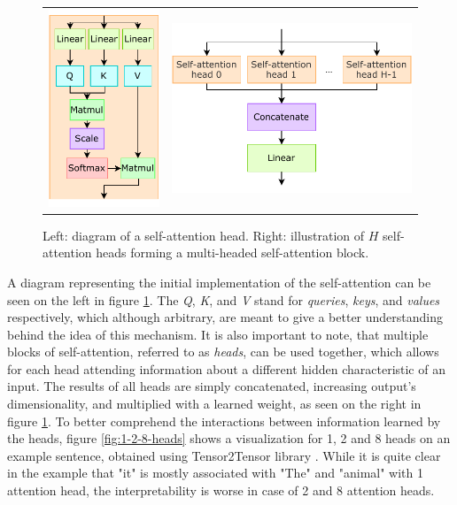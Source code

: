 \begin{figure}[!hpt]
  \centering
  \begin{tabular}{cc}
      {\includegraphics[width=0.2\columnwidth]{background/self_attention.pdf}} &
      {\includegraphics[width=0.4\columnwidth]{background/multi_head_self_attention.pdf}}
  \end{tabular}
  \caption{Left: diagram of a self-attention head. Right: illustration of \(H\) self-attention heads forming a multi-headed self-attention block.}
  \label{fig:self-attention-multi-head}
\end{figure}

A diagram representing the initial implementation of the self-attention can be seen on the left in figure \ref{fig:self-attention-multi-head}. The \textit{Q}, \textit{K}, and \textit{V} stand for \textit{queries}, \textit{keys}, and \textit{values} respectively, which although arbitrary, are meant to give a better understanding behind the idea of this mechanism. It is also important to note, that multiple blocks of self-attention, referred to as \textit{heads}, can be used together, which allows for each head attending information about a different hidden characteristic of an input. The results of all heads are simply concatenated, increasing output's dimensionality, and multiplied with a learned weight, as seen on the right in figure \ref{fig:self-attention-multi-head}. To better comprehend the interactions between information learned by the heads, figure \ref{fig:1-2-8-heads} shows a visualization for 1, 2 and 8 heads on an example sentence, obtained using Tensor2Tensor library \cite{tensor2tensor,73-alammarillustrated}. While it is quite clear in the example that "it" is mostly associated with "The" and "animal" with 1 attention head, the interpretability is worse in case of 2 and 8 attention heads.

